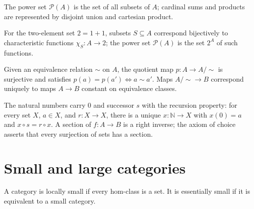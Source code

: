 \begin{definition}
\label{def:lbc-power-set}
The power set $\mathcal P(A)$ is the set of all subsets of $A$; cardinal sums
and products are represented by disjoint union and cartesian product.
\end{definition}

\begin{remark}
\label{rem:lbc-characteristic-functions}
For the two-element set $2=1+1$, subsets $S\subseteq A$ correspond bijectively
to characteristic functions $\chi_S:A\to2$; the power set $\mathcal P(A)$ is
the set $2^A$ of such functions.
\end{remark}

\begin{remark}
\label{rem:lbc-set-quotient}
Given an equivalence relation $\sim$ on $A$, the quotient map
$p:A\to A/{\sim}$ is surjective and satisfies
$p(a)=p(a')\iff a\sim a'$. Maps $A/{\sim}\to B$ correspond uniquely to maps
$A\to B$ constant on equivalence classes.
\end{remark}

\begin{remark}
\label{rem:lbc-natural-numbers-choice}
The natural numbers carry $0$ and successor $s$ with the recursion property:
for every set $X$, $a\in X$, and $r:X\to X$, there is a unique
$x:\mathbb N\to X$ with $x(0)=a$ and $x\circ s=r\circ x$. A section of
$f:A\to B$ is a right inverse; the axiom of choice asserts that every
surjection of sets has a section.
\end{remark}

\section{Small and large categories}
\begin{definition}
\label{def:lbc-locally-small}
A category is locally small if every hom-class is a set. It is essentially small
if it is equivalent to a small category.
\end{definition}

